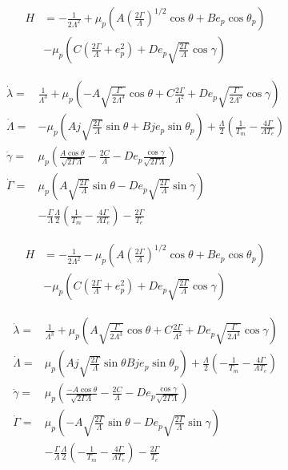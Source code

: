\documentclass[12pt]{extarticle}
\begin{document}
\begin{minipage}[t]{0.5\linewidth}
\begin{align*}
  H
  &= - \frac{1}{2\Lambda^2} + \mu_p\left(A
    \left(\frac{2\Gamma}{\Lambda}\right)^{1/2}\cos\theta + B
    e_p\cos\theta_p\right) \\
  &- \mu_p \left(C\left(\frac{2\Gamma}{\Lambda}
      + e_p^2\right) + De_p
    \sqrt{\frac{2\Gamma}{\Lambda}}\cos\gamma\right)
\end{align*}

\begin{align*}
\dot{\lambda}
  =& \frac{1}{\Lambda^3} + \mu_p\left(-A\sqrt{\frac{\Gamma}{2\Lambda^3}}\cos\theta
    + C\frac{2\Gamma}{\Lambda^2} + De_p\sqrt{\frac{\Gamma}{2\Lambda^3}}\cos\gamma\right) \\
\dot{\Lambda} =& -\mu_p \left(Aj\sqrt{\frac{2\Gamma}{\Lambda}}\sin\theta
      +Bj e_p\sin\theta_p\right) + \frac{\Lambda}{2}\left(\frac{1}{T_m}-\frac{4\Gamma}{\Lambda T_e}\right) \\
\dot{\gamma} =& \mu_p\left(\frac{A\cos\theta}{\sqrt{2\Gamma\Lambda}}
    - \frac{2C}{\Lambda} - De_p\frac{\cos\gamma}{\sqrt{2\Gamma\Lambda}} \right) \\
  \dot{\Gamma} = &\mu_p\left(A\sqrt{\frac{2\Gamma}{\Lambda}}\sin\theta
    - De_p\sqrt{\frac{2\Gamma}{\Lambda}}\sin \gamma\right)  \\
&-\frac{\Gamma}{\Lambda}\frac{\Lambda}{2}\left(\frac{1}{T_m}-\frac{4\Gamma}{\Lambda T_e}\right)
  -\frac{2\Gamma}{T_e}
\end{align*}
\end{minipage}
\begin{minipage}[t]{0.5\linewidth}
\begin{align*}
  H
  &= - \frac{1}{2\Lambda^2} - \mu_p\left(A
    \left(\frac{2\Gamma}{\Lambda}\right)^{1/2}\cos\theta + B
    e_p\cos\theta_p\right) \\
  &- \mu_p \left(C\left(\frac{2\Gamma}{\Lambda}
      + e_p^2\right) + De_p
    \sqrt{\frac{2\Gamma}{\Lambda}}\cos\gamma\right)
\end{align*}

\begin{align*}
\dot{\lambda}
  =& \frac{1}{\Lambda^3} + \mu_p\left(A\sqrt{\frac{\Gamma}{2\Lambda^3}}\cos\theta
    + C\frac{2\Gamma}{\Lambda^2} + De_p\sqrt{\frac{\Gamma}{2\Lambda^3}}\cos\gamma\right)\\
\dot{\Lambda} =& \mu_p \left(Aj\sqrt{\frac{2\Gamma}{\Lambda}}\sin\theta
      Bj e_p\sin\theta_p\right) + \frac{\Lambda}{2}\left(-\frac{1}{T_m}-\frac{4\Gamma}{\Lambda T_e}\right) \\
\dot{\gamma} =& \mu_p\left(\frac{-A\cos\theta}{\sqrt{2\Gamma\Lambda}}
    - \frac{2C}{\Lambda} - De_p\frac{\cos\gamma}{\sqrt{2\Gamma\Lambda}} \right)\\
  \dot{\Gamma} =& \mu_p\left(-A\sqrt{\frac{2\Gamma}{\Lambda}}\sin\theta
    - De_p\sqrt{\frac{2\Gamma}{\Lambda}}\sin \gamma\right) \\
&-\frac{\Gamma}{\Lambda}\frac{\Lambda}{2}\left(-\frac{1}{T_m}-\frac{4\Gamma}{\Lambda T_e}\right)
  -\frac{2\Gamma}{T_e}
\end{align*}
\end{minipage}
\newpage
\end{document}
